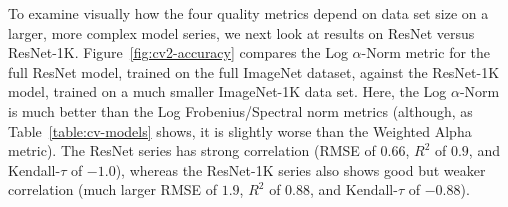 To examine visually how the four quality metrics depend on data set size on a larger, more complex model series, we next look at results on ResNet versus ResNet-1K.
Figure~\ref{fig:cv2-accuracy} compares the Log $\alpha$-Norm metric for the full ResNet model, trained on the full ImageNet dataset, against the ResNet-1K model, trained on a much smaller ImageNet-1K data set.
Here, the Log $\alpha$-Norm is much better than the Log Frobenius/Spectral norm metrics (although, as Table~\ref{table:cv-models} shows, it is slightly worse than the Weighted Alpha metric).
The ResNet series has strong correlation (RMSE of $0.66$, $R^2$ of $0.9$, and Kendall-$\tau$ of $-1.0$), whereas the ResNet-1K series also shows good but weaker correlation (much larger RMSE of $1.9$, $R^2$ of $0.88$, and Kendall-$\tau$ of $-0.88$).




